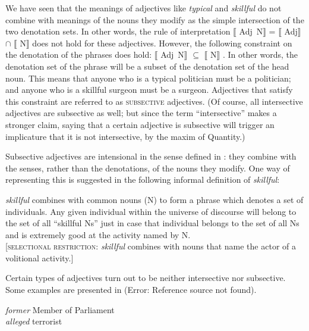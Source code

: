 We have seen that the meanings of adjectives like \textit{typical} and \textit{skillful} do not combine with meanings of the nouns they modify as the simple intersection of the two denotation sets. In other words, the rule of interpretation $\llbracket$ Adj~N$\rrbracket$  = $\llbracket$ Adj$\rrbracket$  ${\cap}$ $\llbracket$ N$\rrbracket$  does not hold for these adjectives. However, the following constraint on the denotation of the phrases does hold: $\llbracket$ Adj~N$\rrbracket$  ${\subseteq}$ $\llbracket$ N$\rrbracket$ . In other words, the denotation set of the phrase will be a subset of the denotation set of the head noun. This means that anyone who is a typical politician must be a politician; and anyone who is a skillful surgeon must be a surgeon. Adjectives that satisfy this constraint are referred to as \textsc{subsective} adjectives. (Of course, all intersective adjectives are subsective as well; but since the term “intersective” makes a stronger claim, saying that a certain adjective is subsective will trigger an implicature that it is not intersective, by the maxim of Quantity.)



Subsective adjectives are intensional in the sense defined in : they combine with the senses, rather than the denotations, of the nouns they modify. One way of representing this is suggested in the following informal definition of \textit{skillful}:


\ea \label{ex:15.9}
\textit{skillful} combines with common nouns (N) to form a phrase which denotes a set of individuals. Any given individual within the universe of discourse will belong to the set of all “skillful Ns” just in case that individual belongs to the set of all Ns and is extremely good at the activity named by N.\\
{}[\textsc{selectional restriction}: \textit{skillful} combines with nouns that name the actor of a volitional activity.]
\z


Certain types of adjectives turn out to be neither intersective nor subsective. Some examples are presented in (Error: Reference source not found).


\ea \label{ex:15.10}
\ea \label{ex:15.} \textit{former} Member of Parliament\\
\ex \textit{alleged} terrorist
\z \z


